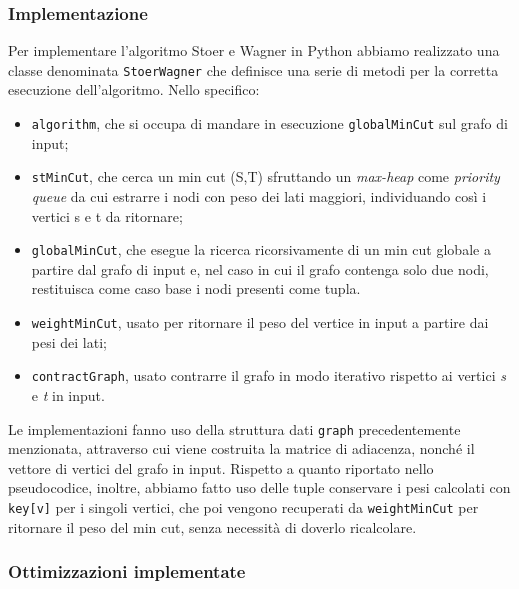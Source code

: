 \subsubsection{Implementazione}

Per implementare l'algoritmo Stoer e Wagner in Python abbiamo realizzato una classe denominata \texttt{StoerWagner} che definisce una serie di metodi per la corretta esecuzione dell'algoritmo.
Nello specifico: 

\begin{itemize}
    \item \texttt{algorithm}, che si occupa di mandare in esecuzione \texttt{globalMinCut} sul grafo di input;
    \item \texttt{stMinCut}, che cerca un min cut (S,T) sfruttando un \textit{max-heap} come \textit{priority queue} da cui estrarre i nodi con peso dei lati maggiori, individuando così i vertici s e t da ritornare;
    \item \texttt{globalMinCut}, che esegue la ricerca ricorsivamente di un min cut globale a partire dal grafo di input e, nel caso in cui il grafo contenga solo due nodi, restituisca come caso base i nodi presenti come tupla.
    \item \texttt{weightMinCut}, usato per ritornare il peso del vertice in input a partire dai pesi dei lati;
    \item \texttt{contractGraph}, usato contrarre il grafo in modo iterativo rispetto ai vertici \textit{s} e \textit{t} in input. 
\end{itemize}

Le implementazioni fanno uso della struttura dati \texttt{graph} precedentemente menzionata, attraverso cui viene costruita la matrice di adiacenza, nonché il vettore di vertici del grafo in input. Rispetto a quanto riportato nello pseudocodice, inoltre, abbiamo fatto uso delle tuple conservare i pesi calcolati con \texttt{key[v]} per i singoli vertici, che poi vengono recuperati da \texttt{weightMinCut} per ritornare il peso del min cut, senza necessità di doverlo ricalcolare.

\subsubsection{Ottimizzazioni implementate}

